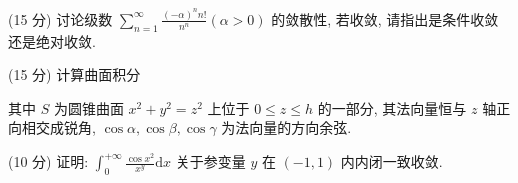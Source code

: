 \par{}
(15 分) 讨论级数 $\sum_{n=1}^{\infty} \frac{(-\alpha)^n n!}{n^n} (\alpha > 0)$ 的敛散性, 若收敛, 请指出是条件收敛还是绝对收敛.\par
\par{}
\par{}
(15 分) 计算曲面积分\par
\nopagebreak[4]
其中 $S$ 为圆锥曲面 $x^{2} + y^{2} = z^{2}$ 上位于 $0 \leq z \leq h$ 的一部分, 其法向量恒与 $z$ 轴正向相交成锐角, $\cos \alpha, \cos \beta, \cos \gamma$ 为法向量的方向余弦.\par
\par{}
(10 分) 证明: $\int_{0}^{+\infty} \frac{\cos x^{2}}{x^{y}} \mathrm{d}x$ 关于参变量 $y$ 在 $(-1,1)$ 内内闭一致收敛.\par
